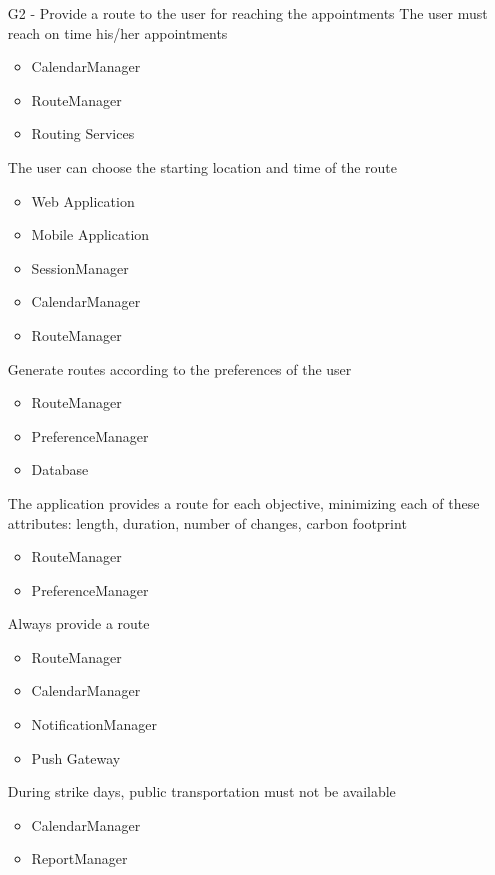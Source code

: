 \begin{itemize}
 	\item[G2] - Provide a route to the user for reaching the appointments
 	\subitem[G2.1] The user must reach on time his/her appointments
 	\begin{itemize}[leftmargin=1in]
 		\item CalendarManager
 		\item RouteManager
 		\item Routing Services
 	\end{itemize}
 	\subitem[G2.2] The user can choose the starting location and time of the route
 	\begin{itemize}[leftmargin=1in]
 		\item Web Application
 		\item Mobile Application
 		\item SessionManager
 		\item CalendarManager
 		\item RouteManager
 	\end{itemize}
 	\subitem[G2.3] Generate routes according to the preferences of the user
 	\begin{itemize}[leftmargin=1in]
 		\item RouteManager
 		\item PreferenceManager
 		\item Database
 	\end{itemize}
 	\subitem[G2.4] The application provides a route for each objective, minimizing each of these attributes: length, duration, number of changes, carbon footprint
 	\begin{itemize}[leftmargin=1in]
 		\item RouteManager
 		\item PreferenceManager
 	\end{itemize}
 	\subitem[G2.5] Always provide a route
 	\begin{itemize}[leftmargin=1in]
 		\item RouteManager
 		\item CalendarManager
 		\item NotificationManager
 		\item Push Gateway
 	\end{itemize}
 	\subitem[G2.6] During strike days, public transportation must not be available
 	\begin{itemize}[leftmargin=1in]
 		\item CalendarManager
 		\item ReportManager
 	\end{itemize}

\end{itemize}
